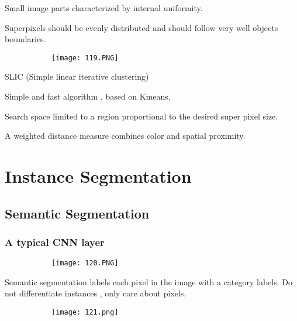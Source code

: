\documentclass{article}
\begin{document}
Small image parts characterized by internal uniformity.

Superpixels should be evenly distributed and should follow very well objects boundaries.

\begin{figure}[ht!]
  \centering
  \begin{subfigure}[b]{0.5\linewidth}
    \texttt{[image: 119.PNG]}
  \end{subfigure}
\end{figure}

SLIC (Simple linear iterative clustering)

Simple and fast algorithm , based on Kmeans,

Search space limited to a region proportional to the desired super pixel size.

A weighted distance measure combines color and spatial proximity.

\section{Instance Segmentation}

\subsection{Semantic Segmentation}

\subsubsection{A typical CNN layer}

\begin{figure}[ht!]
  \centering
  \begin{subfigure}[b]{0.5\linewidth}
    \texttt{[image: 120.PNG]}
  \end{subfigure}
\end{figure}

Semantic segmentation labels each pixel in the image with a category labels. Do not differentiate instances , only care about pixels.

\begin{figure}[ht!]
  \centering
  \begin{subfigure}[b]{0.5\linewidth}
    \texttt{[image: 121.png]}
  \end{subfigure}
\end{figure}

\vspace{10mm}
\end{document}
